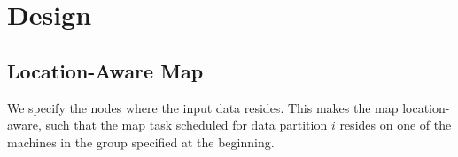 \section{Design}

\subsection{Location-Aware Map}

We specify the nodes where the input data resides. This makes the map location-aware, such that the map task scheduled for data partition $i$ resides on one of the machines in the group specified at the beginning.
